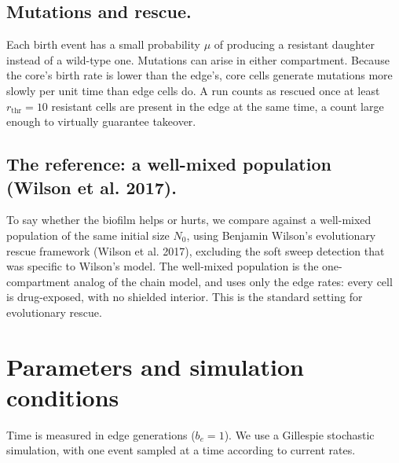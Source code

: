 \documentclass[11pt]{article}
\newcommand{\Nzero}{N_0}
\newcommand{\bEdge}{b_e}
\begin{document}
\subsection{Mutations and rescue.}
Each birth event has a small probability $\mu$ of producing a
resistant daughter instead of a wild-type one. Mutations can arise
in either compartment. Because the core's birth rate is lower than
the edge's, core cells generate mutations more slowly per unit time
than edge cells do. A run counts as rescued once at least
$r_{\text{thr}} = 10$ resistant cells are present in the edge at
the same time, a count large enough to virtually guarantee takeover.

\subsection{The reference: a well-mixed population (Wilson et al. 2017).}
To say whether the biofilm helps or hurts, we compare against a
well-mixed population of the same initial size $\Nzero$, using Benjamin Wilson's evolutionary rescue framework (Wilson et al. 2017), excluding the soft sweep detection that was specific to Wilson's model. The
well-mixed population is the one-compartment analog of the chain model, and uses only the edge rates: every cell is drug-exposed, with no shielded interior. This is the standard setting for evolutionary rescue.



\section{Parameters and simulation conditions}
\label{sec:params}


Time is measured in edge generations ($\bEdge = 1$). We use a Gillespie
stochastic simulation, with one event sampled at a time according to
current rates.
\end{document}
